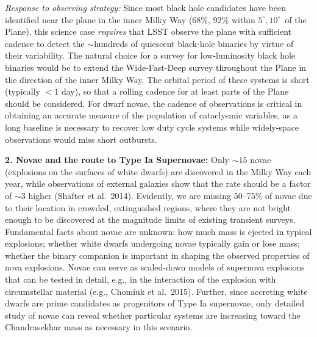 {\it Response to observing strategy:} Since most black hole candidates
have been identified near the plane in the inner Milky Way (68\%, 92\%
within $5^{\circ}, 10^{\circ}$~of the Plane), this science case {\it
    requires} that LSST observe the plane with sufficient cadence to
  detect the $\sim$hundreds of quiescent black-hole binaries by virtue
  of their variability. The natural choice for a survey for
  low-luminosity black hole binaries would be to extend the
  Wide-Fast-Deep survey throughout the Plane in the direction of the
  inner Milky Way. The orbital period of these systems is short (typically $<1$ day), so that a rolling cadence
  for at least parts of the Plane should be considered. For dwarf novae, the cadence of observations
  is critical in obtaining an accurate measure of the population of
  cataclysmic variables, as a long baseline is necessary to recover
  low duty cycle systems while widely-space observations
 would miss short outbursts.



{\bf 2. Novae and the route to Type Ia Supernovae:} Only $\sim 15$
novae (explosions on the surfaces of white dwarfs) are discovered in
the Milky Way each year, while observations of external galaxies show
that the rate should be a factor of $\sim 3$ higher (Shafter et
al.~2014). Evidently, we are missing 50--75\% of novae due to their
location in crowded, extinguished regions, where they are not bright
enough to be discovered at the magnitude limits of existing transient
surveys. Fundamental facts about novae are unknown: how much mass is
ejected in typical explosions; whether white dwarfs undergoing novae
typically gain or lose mass; whether the binary companion is important
in shaping the observed properties of nova explosions. Novae can serve
as scaled-down models of supernova explosions that can be tested in
detail, e.g., in the interaction of the explosion with circumstellar
material (e.g., Chomiuk et al.~2015). Further, since accreting white
dwarfs are prime candidates as progenitors of Type Ia supernovae, only
detailed study of novae can reveal whether particular systems are
increasing toward the Chandrasekhar mass as necessary in this
scenario.

